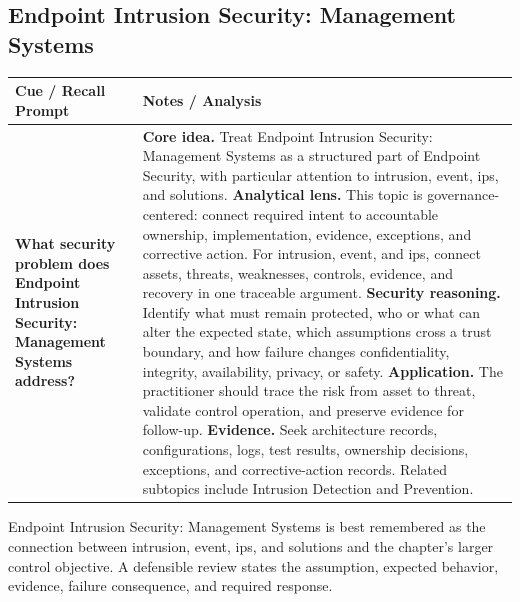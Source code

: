 \documentclass[11pt]{article}
\newcommand{\CornellHeader}{%
\rowcolor{Navy}\color{white}\bfseries Cue / Recall Prompt & \color{white}\bfseries Notes / Analysis\\\hline}
\newcommand{\CornellRow}[2]{%
\cellcolor{CueGray}\RaggedRight\textbf{#1} & \RaggedRight #2\\\hline}
\begin{document}
\subsection*{Endpoint Intrusion Security: Management Systems}
\begin{longtable}{>{\RaggedRight\arraybackslash}p{}|>{\RaggedRight\arraybackslash}p{}}
\CornellHeader
\CornellRow{What security problem does Endpoint Intrusion Security: Management Systems address?}{\textbf{Core idea.} Treat Endpoint Intrusion Security: Management Systems as a structured part of Endpoint Security, with particular attention to intrusion, event, ips, and solutions. \textbf{Analytical lens.} This topic is governance-centered: connect required intent to accountable ownership, implementation, evidence, exceptions, and corrective action. For intrusion, event, and ips, connect assets, threats, weaknesses, controls, evidence, and recovery in one traceable argument. \textbf{Security reasoning.} Identify what must remain protected, who or what can alter the expected state, which assumptions cross a trust boundary, and how failure changes confidentiality, integrity, availability, privacy, or safety. \textbf{Application.} The practitioner should trace the risk from asset to threat, validate control operation, and preserve evidence for follow-up. \textbf{Evidence.} Seek architecture records, configurations, logs, test results, ownership decisions, exceptions, and corrective-action records. Related subtopics include Intrusion Detection and Prevention.}
\end{longtable}
\begin{topicsummary}
Endpoint Intrusion Security: Management Systems is best remembered as the connection between intrusion, event, ips, and solutions and the chapter's larger control objective. A defensible review states the assumption, expected behavior, evidence, failure consequence, and required response.
\end{topicsummary}
\end{document}

